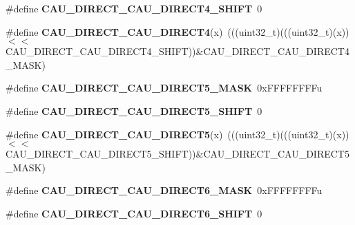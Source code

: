 \begin{DoxyCompactItemize}
\item 
\#define {\bfseries C\+A\+U\+\_\+\+D\+I\+R\+E\+C\+T\+\_\+\+C\+A\+U\+\_\+\+D\+I\+R\+E\+C\+T4\+\_\+\+S\+H\+I\+FT}~0\hypertarget{group__CAU__Register__Masks_ga14860fd31f4e7f9792da121883d992d9}{}\label{group__CAU__Register__Masks_ga14860fd31f4e7f9792da121883d992d9}

\item 
\#define {\bfseries C\+A\+U\+\_\+\+D\+I\+R\+E\+C\+T\+\_\+\+C\+A\+U\+\_\+\+D\+I\+R\+E\+C\+T4}(x)~(((uint32\+\_\+t)(((uint32\+\_\+t)(x))$<$$<$C\+A\+U\+\_\+\+D\+I\+R\+E\+C\+T\+\_\+\+C\+A\+U\+\_\+\+D\+I\+R\+E\+C\+T4\+\_\+\+S\+H\+I\+FT))\&C\+A\+U\+\_\+\+D\+I\+R\+E\+C\+T\+\_\+\+C\+A\+U\+\_\+\+D\+I\+R\+E\+C\+T4\+\_\+\+M\+A\+SK)\hypertarget{group__CAU__Register__Masks_gaf17ec77a232bb8d8322c995e1e4808a8}{}\label{group__CAU__Register__Masks_gaf17ec77a232bb8d8322c995e1e4808a8}

\item 
\#define {\bfseries C\+A\+U\+\_\+\+D\+I\+R\+E\+C\+T\+\_\+\+C\+A\+U\+\_\+\+D\+I\+R\+E\+C\+T5\+\_\+\+M\+A\+SK}~0x\+F\+F\+F\+F\+F\+F\+F\+Fu\hypertarget{group__CAU__Register__Masks_gaa8212c898d5d71af9b7003bcc5c68a58}{}\label{group__CAU__Register__Masks_gaa8212c898d5d71af9b7003bcc5c68a58}

\item 
\#define {\bfseries C\+A\+U\+\_\+\+D\+I\+R\+E\+C\+T\+\_\+\+C\+A\+U\+\_\+\+D\+I\+R\+E\+C\+T5\+\_\+\+S\+H\+I\+FT}~0\hypertarget{group__CAU__Register__Masks_ga7f59928c2b946e1d249aa9b3b3fdd537}{}\label{group__CAU__Register__Masks_ga7f59928c2b946e1d249aa9b3b3fdd537}

\item 
\#define {\bfseries C\+A\+U\+\_\+\+D\+I\+R\+E\+C\+T\+\_\+\+C\+A\+U\+\_\+\+D\+I\+R\+E\+C\+T5}(x)~(((uint32\+\_\+t)(((uint32\+\_\+t)(x))$<$$<$C\+A\+U\+\_\+\+D\+I\+R\+E\+C\+T\+\_\+\+C\+A\+U\+\_\+\+D\+I\+R\+E\+C\+T5\+\_\+\+S\+H\+I\+FT))\&C\+A\+U\+\_\+\+D\+I\+R\+E\+C\+T\+\_\+\+C\+A\+U\+\_\+\+D\+I\+R\+E\+C\+T5\+\_\+\+M\+A\+SK)\hypertarget{group__CAU__Register__Masks_ga1f7ce76ab2e7c9239af0b250337e1055}{}\label{group__CAU__Register__Masks_ga1f7ce76ab2e7c9239af0b250337e1055}

\item 
\#define {\bfseries C\+A\+U\+\_\+\+D\+I\+R\+E\+C\+T\+\_\+\+C\+A\+U\+\_\+\+D\+I\+R\+E\+C\+T6\+\_\+\+M\+A\+SK}~0x\+F\+F\+F\+F\+F\+F\+F\+Fu\hypertarget{group__CAU__Register__Masks_ga971c00d2038809c2c31c18f8942807ec}{}\label{group__CAU__Register__Masks_ga971c00d2038809c2c31c18f8942807ec}

\item 
\#define {\bfseries C\+A\+U\+\_\+\+D\+I\+R\+E\+C\+T\+\_\+\+C\+A\+U\+\_\+\+D\+I\+R\+E\+C\+T6\+\_\+\+S\+H\+I\+FT}~0\hypertarget{group__CAU__Register__Masks_ga4dea5b62b401604587b9fa6ed0d98f65}{}\label{group__CAU__Register__Masks_ga4dea5b62b401604587b9fa6ed0d98f65}


\end{DoxyCompactItemize}
